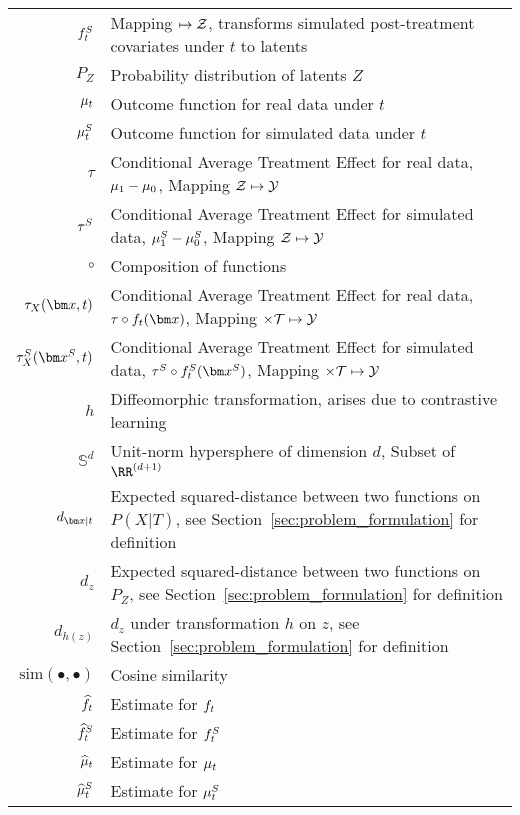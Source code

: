 \begin{table}[H]
{\begin{tabular}{r|l}
         $f^S_t$& Mapping $\mapsto\mathcal{Z}$, transforms simulated post-treatment covariates under $t$ to latents\\
         $P_Z$ & Probability distribution of latents $Z$\\
         $\mu_t$ & Outcome function for real data under $t$\\
        $\mu^S_t$ & Outcome function for simulated data under $t$\\
        $\tau$ & Conditional Average Treatment Effect for real data, $\mu_1 - \mu_0$, Mapping $\mathcal{Z} \mapsto \mathcal{Y}$\\
        $\tau^S$ & Conditional Average Treatment Effect for simulated data, $\mu^S_1 - \mu^S_0$, Mapping $\mathcal{Z} \mapsto \mathcal{Y}$\\
        $\circ$ & Composition of functions\\
        $\ITEx(\xb, t)$ & Conditional Average Treatment Effect for real data, $\tau \circ \RInv_t(\xb)$, Mapping $ \times \mathcal{T}\mapsto\mathcal{Y}$\\
        $\ITExSyn(\xb^S, t)$ & Conditional Average Treatment Effect for simulated data, $\syntau \circ 
        \SInv_t(\xb^S)$, Mapping $ \times \mathcal{T}\mapsto\mathcal{Y}$\\
        $h$ & Diffeomorphic transformation, arises due to contrastive learning \\%
        $\mathbb{S}^{d}$ & Unit-norm hypersphere of dimension $d$, Subset of $\RR^{(d+1)}$\\
        $d_{\xb|t}$ & Expected squared-distance between two functions on $P(X|T)$, see Section~\ref{sec:problem_formulation} for definition\\
        $d_{z}$ & Expected squared-distance between two functions on $P_Z$, see Section~\ref{sec:problem_formulation} for definition\\
        $d_{h(z)}$ & $d_z$ under transformation $h$ on $z$, see Section~\ref{sec:problem_formulation} for definition\\
        $\textrm{sim}(\bullet, \bullet)$ & Cosine similarity\\
        \hline
        $\widehat{f}_t$ & Estimate for $f_t$ \\
        $\widehat{f}^S_t$ & Estimate for $f^S_t$\\
        $\widehat{\mu}_t$ & Estimate for $\mu_t$\\
        $\widehat{\mu}^S_t$ & Estimate for $\mu^S_t$\\

\end{tabular}}
\end{table}
